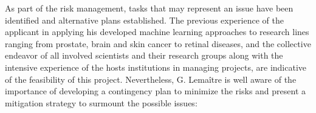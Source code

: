 As part of the risk management, tasks that may represent an issue have been identified and alternative plans established. 
The previous experience of the applicant in applying his developed machine learning approaches to research lines ranging from prostate, brain and skin cancer to retinal diseases, and the collective endeavor of all involved scientists and their research groups along with the intensive experience of the hosts institutions in managing projects, are indicative of the feasibility of this project. 
Nevertheless, G. Lema\^itre is well aware of the importance of developing a contingency plan to minimize the risks and present a mitigation strategy to surmount the possible issues:

